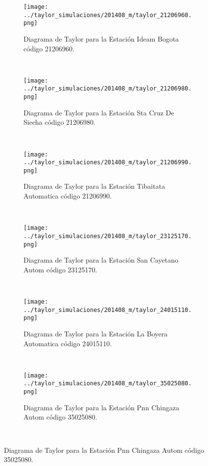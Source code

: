 \begin{figure}[H]\ContinuedFloat
\begin{subfigure}[normla]{0.5\textwidth}
\caption{Diagrama de Taylor para la Estación Ideam Bogota código 21206960.}
\texttt{[image: ../taylor\_simulaciones/201408\_m/taylor\_21206960.png]}
\end{subfigure}
~
\begin{subfigure}[normla]{0.5\textwidth}
\caption{Diagrama de Taylor para la Estación Sta Cruz De Siecha código 21206980.}
\texttt{[image: ../taylor\_simulaciones/201408\_m/taylor\_21206980.png]}
\end{subfigure}
~
\begin{subfigure}[normla]{0.5\textwidth}
\caption{Diagrama de Taylor para la Estación Tibaitata Automatica código 21206990.}
\texttt{[image: ../taylor\_simulaciones/201408\_m/taylor\_21206990.png]}
\end{subfigure}
~
\begin{subfigure}[normla]{0.5\textwidth}
\caption{Diagrama de Taylor para la Estación San Cayetano Autom  código 23125170.}
\texttt{[image: ../taylor\_simulaciones/201408\_m/taylor\_23125170.png]}
\end{subfigure}
~
\begin{subfigure}[normla]{0.5\textwidth}
\caption{Diagrama de Taylor para la Estación La Boyera Automatica código 24015110.}
\texttt{[image: ../taylor\_simulaciones/201408\_m/taylor\_24015110.png]}
\end{subfigure}
~
\begin{subfigure}[normla]{0.5\textwidth}
\caption{Diagrama de Taylor para la Estación Pnn Chingaza Autom  código 35025080.}
\texttt{[image: ../taylor\_simulaciones/201408\_m/taylor\_35025080.png]}
\end{subfigure}
~
\end{figure}
           
